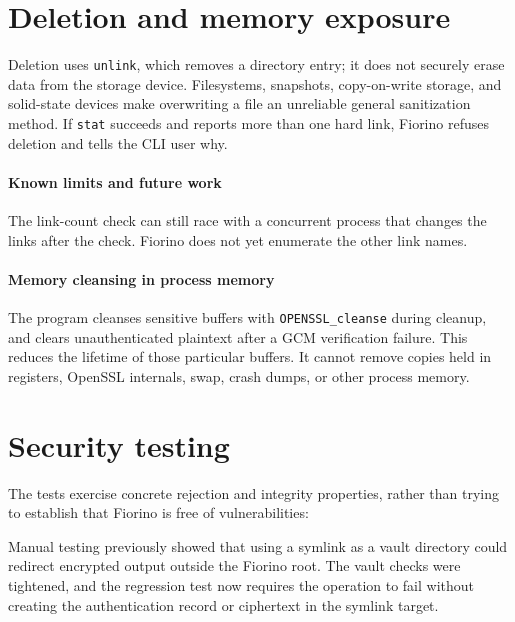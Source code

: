 \section{Deletion and memory exposure}

Deletion uses \texttt{unlink}, which removes a directory entry; it does not
securely erase data from the storage device. Filesystems, snapshots, copy-on-write
storage, and solid-state devices make overwriting a file an unreliable general
sanitization method. If \texttt{stat} succeeds and reports more than one hard
link, Fiorino refuses deletion and tells the CLI user why.

\paragraph{Known limits and future work}
The link-count check can still race with a concurrent process
that changes the links after the check. Fiorino does not yet enumerate the other
link names.

\paragraph{Memory cleansing in process memory}
The program cleanses sensitive buffers with \texttt{OPENSSL\_cleanse} during
cleanup, and clears unauthenticated plaintext after a GCM verification
failure. This reduces the lifetime of those particular buffers. It cannot
remove copies held in registers, OpenSSL internals, swap, crash dumps, or
other process memory.

\section{Security testing}

The tests exercise concrete rejection and integrity properties, rather than
trying to establish that Fiorino is free of vulnerabilities:

Manual testing previously showed that using a symlink as a vault directory
could redirect encrypted output outside the Fiorino root. The vault checks
were tightened, and the regression test now requires the operation to fail
without creating the authentication record or ciphertext in the symlink
target.

